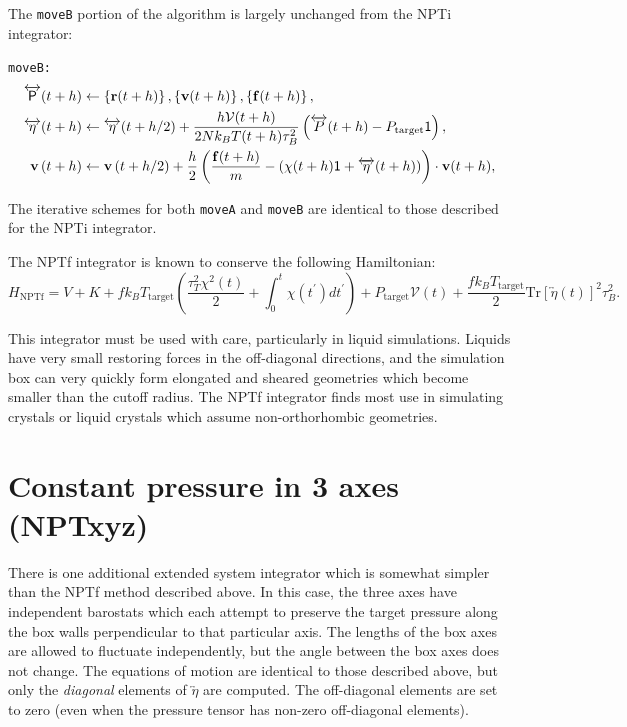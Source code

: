 \documentclass[letterpaper]{report}
\begin{document}
The {\tt moveB} portion of the algorithm is largely unchanged from the
NPTi integrator:

{\tt moveB:}
\begin{align*}
\overleftrightarrow{\mathsf{P}}(t + h) &\leftarrow \left\{{\bf r}
	(t + h)\right\}, \left\{{\bf v}(t 
	+ h)\right\}, \left\{{\bf f}(t + h)\right\} ,\\
%
\overleftrightarrow{\eta}(t + h) &\leftarrow 
	\overleftrightarrow{\eta}(t + h / 2) +
	\frac{h \mathcal{V}(t + h)}{2 N k_B T(t + h) 
	\tau_B^2} \left( \overleftrightarrow{P}(t + h) 
	- P_{\mathrm{target}}\mathsf{1} \right) ,\\ 
%
{\bf v}\left(t + h \right)  &\leftarrow {\bf v}\left(t 
	+ h / 2 \right) + \frac{h}{2} \left(
	\frac{{\bf f}(t + h)}{m} - 
	(\chi(t + h)\mathsf{1} + \overleftrightarrow{\eta}(t 
	+ h)) \right) \cdot {\bf v}(t + h), \\
\end{align*}

The iterative schemes for both {\tt moveA} and {\tt moveB} are
identical to those described for the NPTi integrator.

The NPTf integrator is known to conserve the following Hamiltonian:
\begin{equation}
H_{\mathrm{NPTf}} = V + K + f k_B T_{\mathrm{target}} \left(
\frac{\tau_{T}^2 \chi^2(t)}{2} + \int_{0}^{t} \chi(t^\prime) dt^\prime
\right) + P_{\mathrm{target}} \mathcal{V}(t) + \frac{f k_B
T_{\mathrm{target}}}{2}
\mathrm{Tr}\left[\overleftrightarrow{\eta}(t)\right]^2 \tau_B^2.
\end{equation}

This integrator must be used with care, particularly in liquid
simulations.  Liquids have very small restoring forces in the
off-diagonal directions, and the simulation box can very quickly form
elongated and sheared geometries which become smaller than the cutoff
radius.  The NPTf integrator finds most use in simulating crystals or
liquid crystals which assume non-orthorhombic geometries.

\section{\label{nptxyz}Constant pressure in 3 axes (NPTxyz)}

There is one additional extended system integrator which is somewhat
simpler than the NPTf method described above.  In this case, the three
axes have independent barostats which each attempt to preserve the
target pressure along the box walls perpendicular to that particular
axis.  The lengths of the box axes are allowed to fluctuate
independently, but the angle between the box axes does not change.
The equations of motion are identical to those described above, but
only the {\it diagonal} elements of $\overleftrightarrow{\eta}$ are
computed.  The off-diagonal elements are set to zero (even when the
pressure tensor has non-zero off-diagonal elements).
\end{document}
